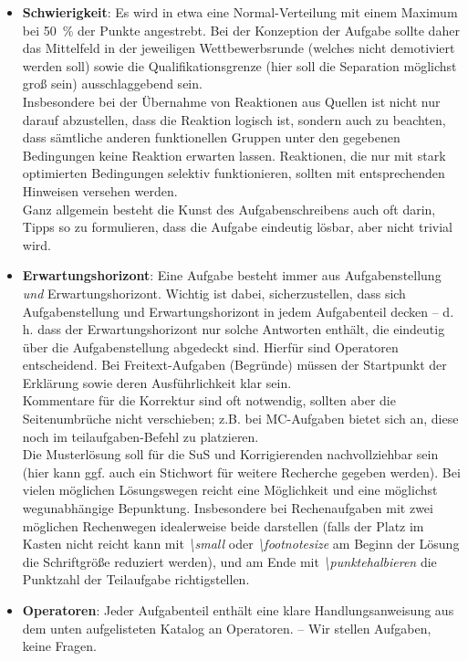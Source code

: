 \documentclass[../main.tex]{subfiles}
\begin{document}
\begin{itemize}
    \item \textbf{Schwierigkeit}: Es wird in etwa eine Normal-Verteilung mit einem Maximum bei \SI{50}{\percent} der Punkte angestrebt. Bei der Konzeption der Aufgabe sollte daher das Mittelfeld in der jeweiligen Wettbewerbsrunde (welches nicht demotiviert werden soll) sowie die Qualifikationsgrenze (hier soll die Separation m\"oglichst groß sein) ausschlaggebend sein.\\ Insbesondere bei der \"Ubernahme von Reaktionen aus Quellen ist nicht nur darauf abzustellen, dass die Reaktion logisch ist, sondern auch zu beachten, dass s\"amtliche anderen funktionellen Gruppen unter den gegebenen Bedingungen keine Reaktion erwarten lassen. Reaktionen, die nur mit stark optimierten Bedingungen selektiv funktionieren, sollten mit entsprechenden Hinweisen versehen werden. \\Ganz allgemein besteht die Kunst des Aufgabenschreibens auch oft darin, Tipps so zu formulieren, dass die Aufgabe eindeutig l\"osbar, aber nicht trivial wird. 
    \item \textbf{Erwartungshorizont}: Eine Aufgabe besteht immer aus Aufgabenstellung \textit{und} Erwartungshorizont. Wichtig ist dabei, sicherzustellen, dass sich Aufgabenstellung und Erwartungshorizont in jedem Aufgabenteil decken -- d. h. dass der Erwartungshorizont nur solche Antworten enth\"alt, die eindeutig \"uber die Aufgabenstellung abgedeckt sind. Hierf\"ur sind Operatoren entscheidend. Bei Freitext-Aufgaben (\glqq Begr\"unde\grqq) m\"ussen der Startpunkt der Erkl\"arung sowie deren Ausf\"uhrlichkeit klar sein. \\
    Kommentare f\"ur die Korrektur sind oft notwendig, sollten aber die Seitenumbr\"uche nicht verschieben; z.B. bei MC-Aufgaben bietet sich an, diese noch im teilaufgaben-Befehl zu platzieren. \\
    Die Musterl\"osung soll f\"ur die SuS und Korrigierenden nachvollziehbar sein (hier kann ggf. auch ein Stichwort f\"ur weitere Recherche gegeben werden). Bei vielen m\"oglichen L\"osungswegen reicht eine M\"oglichkeit und eine m\"oglichst wegunabh\"angige Bepunktung. Insbesondere bei Rechenaufgaben mit zwei m\"oglichen Rechenwegen idealerweise beide darstellen (falls der Platz im Kasten nicht reicht kann mit \textit{\textbackslash small} oder \textit{\textbackslash footnotesize} am Beginn der L\"osung die Schriftgr\"o\ss{}e reduziert werden), und am Ende mit \textit{\textbackslash punktehalbieren} die Punktzahl der Teilaufgabe richtigstellen. 
    \item \textbf{Operatoren}: Jeder Aufgabenteil enth\"alt eine klare Handlungsanweisung aus dem unten aufgelisteten Katalog an Operatoren. -- \glqq{}Wir stellen Aufgaben, keine Fragen.\grqq{}

\end{itemize}
\end{document}
